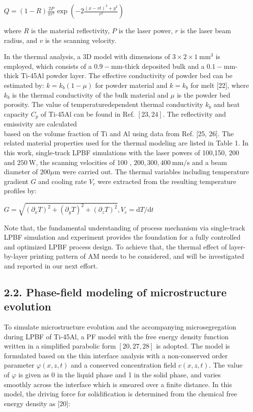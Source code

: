 \documentclass[10pt]{article}
\begin{document}
$Q=(1-R) \frac{2 P}{\pi r^{2}} \exp \left(-2 \frac{(x-v t)^{2}+y^{2}}{r^{2}}\right)$

where $R$ is the material reflectivity, $P$ is the laser power, $r$ is the laser beam radius, and $v$ is the scanning velocity.

In the thermal analysis, a 3D model with dimensions of $3 \times 2 \times 1 \mathrm{~mm}^{3}$ is employed, which consists of a $0.9-\mathrm{mm}$-thick deposited bulk and a $0.1-\mathrm{mm}$-thick Ti-45Al powder layer. The effective conductivity of powder bed can be estimated by: $k=k_{b}(1-\mu)$ for powder material and $k=k_{b}$ for melt [22], where $k_{b}$ is the thermal conductivity of the bulk material and $\mu$ is the powder bed porosity. The value of temperaturedependent thermal conductivity $k_{b}$ and heat capacity $C_{p}$ of Ti-45Al can be found in Ref. $[23,24]$. The reflectivity and emissivity are calculated\\
based on the volume fraction of Ti and Al using data from Ref. [25, 26]. The related material properties used for the thermal modeling are listed in Table 1. In this work, single-track LPBF simulations with the laser powers of 100,150, 200 and $250 \mathrm{~W}$, the scanning velocities of 100 , $200,300,400 \mathrm{~mm} / \mathrm{s}$ and a beam diameter of $200 \mu \mathrm{m}$ were carried out. The thermal variables including temperature gradient $G$ and cooling rate $V_{c}$ were extracted from the resulting temperature profiles by:

$G=\sqrt{\left(\partial_{x} T\right)^{2}+\left(\partial_{y} T\right)^{2}+\left(\partial_{z} T\right)^{2}}, V_{c}=\mathrm{d} T / \mathrm{d} t$

Note that, the fundamental understanding of process mechanism via single-track LPBF simulation and experiment provides the foundation for a fully controlled and optimized LPBF process design. To achieve that, the thermal effect of layer-by-layer printing pattern of AM needs to be considered, and will be investigated and reported in our next effort.

\subsection*{2.2. Phase-field modeling of microstructure evolution}
To simulate microstructure evolution and the accompanying microsegregation during LPBF of Ti-45Al, a PF model with the free energy density function written in a simplified parabolic form $[20,27,28]$ is adopted. The model is formulated based on the thin interface analysis with a non-conserved order parameter $\varphi(x, z, t)$ and a conserved concentration field $c(x, z, t)$. The value of $\varphi$ is given as 0 in the liquid phase and 1 in the solid phase, and varies smoothly across the interface which is smeared over a finite distance. In this model, the driving force for solidification is determined from the chemical free energy density as [20]:
\end{document}
